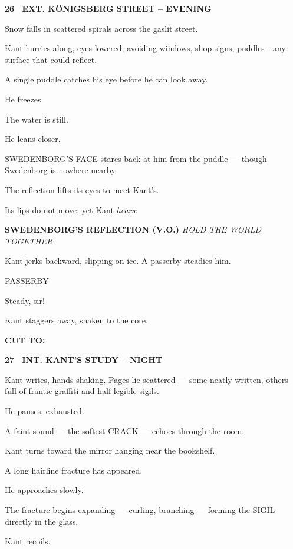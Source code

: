 \documentclass[12pt]{article}
\newcommand{\scene}[2]{%
  \vspace{1.8\baselineskip}%
  \noindent\textbf{#1 \ #2}\par\vspace{0.4\baselineskip}%
}
\newenvironment{dialogue}[1]{%
  \vspace{0.8\baselineskip}%
  \noindent\hspace*{2.3in}\textsc{#1}\par%
  \noindent\hspace*{1.5in}\begin{minipage}[t]{4.5in}%
}{%
  \end{minipage}\par%
}
\newcommand{\transition}[1]{%
  \vspace{0.6\baselineskip}%
  \begin{flushright}\textbf{#1}\end{flushright}%
}
\begin{document}

\scene{26}{EXT. KÖNIGSBERG STREET -- EVENING}

Snow falls in scattered spirals across the gaslit street.

Kant hurries along, eyes lowered, avoiding windows, shop signs,
puddles—any surface that could reflect.

A single puddle catches his eye before he can look away.

He freezes.

The water is still.

He leans closer.

SWEDENBORG’S FACE stares back at him from the puddle — though Swedenborg
is nowhere nearby.

The reflection lifts its eyes to meet Kant’s.

Its lips do not move, yet Kant \emph{hears}:

\textbf{SWEDENBORG'S REFLECTION (V.O.)}  
\emph{HOLD THE WORLD TOGETHER.}

Kant jerks backward, slipping on ice. A passerby steadies him.

\begin{dialogue}{PASSERBY}
Steady, sir!
\end{dialogue}

Kant staggers away, shaken to the core.

\transition{CUT TO:}


\scene{27}{INT. KANT'S STUDY -- NIGHT}

Kant writes, hands shaking. Pages lie scattered — some neatly written,
others full of frantic graffiti and half-legible sigils.

He pauses, exhausted.

A faint sound — the softest CRACK — echoes through the room.

Kant turns toward the mirror hanging near the bookshelf.

A long hairline fracture has appeared.

He approaches slowly.

The fracture begins expanding — curling, branching — forming the SIGIL
directly in the glass.

Kant recoils.
\end{document}
